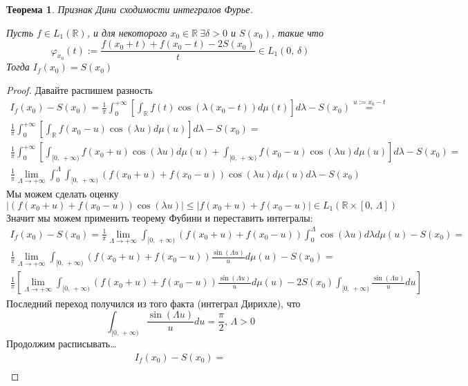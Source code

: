 \documentclass[a4paper,12pt]{article}
\renewcommand{\phi}{\ensuremath{\varphi}}
\renewcommand{\leq}{\ensuremath{\leqslant}}
\theoremstyle{plain}
\newtheorem{theorem}{Теорема}[section]
\theoremstyle{definition}
\theoremstyle{remark}
\begin{document}
\begin{theorem}
	Признак Дини сходимости интегралов Фурье.

	Пусть $f \in L_1(\mathbb{R})$, и для некоторого $x_0 \in \mathbb{R}\: \exists \delta > 0$ и $S(x_0)$, такие что
	\[\phi_{x_0}(t) := \frac{f(x_0 + t) + f(x_0 - t) - 2S(x_0)}{t} \in L_1(0,\,\delta)\]
	Тогда $I_f(x_0) = S(x_0)$
\end{theorem}
\begin{proof} \label{DINI_FURRY}
	Давайте распишем разность
	\begin{align*}
		I_f(x_0) - S(x_0) = \frac{1}{\pi}\int_0^{+\infty}\left[\int_\mathbb{R}f(t)\cos(\lambda (x_0 - t))d\mu(t)\right]d\lambda - S(x_0) \stackrel{u := x_0 - t}{=}              \\
		\frac{1}{\pi}\int_0^{+\infty}\left[\int_\mathbb{R}f(x_0 - u)\cos(\lambda u)d\mu(u)\right]d\lambda - S(x_0) =                                                             \\
		\frac{1}{\pi}\int_0^{+\infty}\left[\int_{[0,\,+\infty)}f(x_0 + u)\cos(\lambda u)d\mu(u) + \int_{[0,\,+\infty)}f(x_0 - u)\cos(\lambda u)d\mu(u)\right]d\lambda - S(x_0) = \\
		\frac{1}{\pi}\lim_{\Lambda \to +\infty}\int_0^\Lambda\int_{[0,\,+\infty)}(f(x_0 + u) + f(x_0 - u))\cos(\lambda u)d\mu(u)d\lambda - S(x_0)
	\end{align*}
	Мы можем сделать оценку
	\[|(f(x_0 + u) + f(x_0 - u))\cos(\lambda u)| \leq |f(x_0 + u) + f(x_0 - u)| \in L_1(\mathbb{R} \times [0,\, \Lambda])\]
	Значит мы можем применить теорему Фубини и переставить интегралы:
	\begin{align*}
		I_f(x_0) - S(x_0) = \frac{1}{\pi}\lim_{\Lambda \to +\infty} \int_{[0,\,+\infty)} (f(x_0 + u) + f(x_0 - u)) \int_0^\Lambda \cos(\lambda u)d\lambda d\mu(u) - S(x_0) = \\
		\frac{1}{\pi}\lim_{\Lambda \to +\infty} \int_{[0,\,+\infty)} (f(x_0 + u) + f(x_0 - u)) \frac{\sin(\Lambda u)}{u}d\mu(u) - S(x_0) =                                   \\
		\frac{1}{\pi}\left[\lim_{\Lambda \to +\infty} \int_{[0,\,+\infty)} (f(x_0 + u) + f(x_0 - u))\frac{\sin(\Lambda u)}{u}d\mu(u) - 2S(x_0)\int_{[0,\,+\infty)} \frac{\sin(\Lambda u)}{u}du\right]
	\end{align*}
	Последний переход получился из того факта (интеграл Дирихле), что
	\[\int_{[0,\,+\infty)}\frac{\sin(\Lambda u)}{u}du = \frac{\pi}{2},\, \Lambda > 0\]
	Продолжим расписывать\dots
	\begin{align*}
		I_f(x_0) - S(x_0) =                                                                                             \\

\end{align*}
\end{proof}
\end{document}
